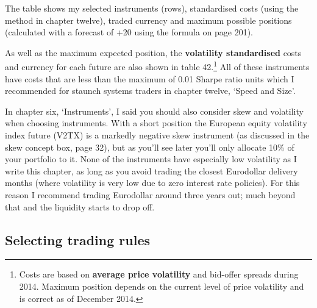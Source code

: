 The table shows my selected instruments (rows), standardised costs (using the method in chapter twelve), traded currency and maximum possible positions (calculated with a forecast of +20 using the formula on page 201).

As well as the maximum expected position, the \textbf{volatility standardised} costs and currency for each future are also shown in table 42.\footnote{Costs are based on \textbf{average price volatility} and bid-offer spreads during 2014. Maximum position depends on the current level of price volatility and is correct as of December 2014.} All of these instruments have costs that are less than the maximum of 0.01 Sharpe ratio units which I recommended for staunch systems traders in chapter twelve, ‘Speed and Size'.

In chapter six, ‘Instruments', I said you should also consider skew and volatility when choosing instruments. With a short position the European equity volatility index future (V2TX) is a markedly negative skew instrument (as discussed in the skew concept box, page 32), but as you'll see later you'll only allocate 10\% of your portfolio to it. None of the instruments have especially low volatility as I write this chapter, as long as you avoid trading the closest Eurodollar delivery months (where volatility is very low due to zero interest rate policies). For this reason I recommend trading Eurodollar around three years out; much beyond that and the liquidity starts to drop off.

\subsection*{Selecting trading rules}

